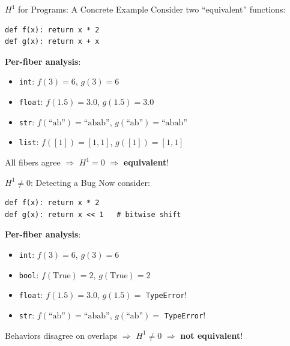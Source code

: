 \documentclass[aspectratio=169,11pt]{beamer}
\begin{document}
\begin{frame}{$H^1$ for Programs: A Concrete Example}
Consider two ``equivalent'' functions:
\begin{lstlisting}[language=deppy]
def f(x): return x * 2
def g(x): return x + x
\end{lstlisting}

\vspace{0.3em}
\textbf{Per-fiber analysis}:
\begin{itemize}
\item \texttt{int}: $f(3) = 6$, $g(3) = 6$ \checkmark
\item \texttt{float}: $f(1.5) = 3.0$, $g(1.5) = 3.0$ \checkmark
\item \texttt{str}: $f(\text{``ab''}) = \text{``abab''}$, $g(\text{``ab''}) = \text{``abab''}$ \checkmark
\item \texttt{list}: $f([1]) = [1,1]$, $g([1]) = [1,1]$ \checkmark
\end{itemize}

\vspace{0.3em}
All fibers agree $\Rightarrow$ $H^1 = 0$ $\Rightarrow$ \textbf{equivalent}!
\end{frame}

\begin{frame}{$H^1 \neq 0$: Detecting a Bug}
Now consider:
\begin{lstlisting}[language=deppy]
def f(x): return x * 2
def g(x): return x << 1   # bitwise shift
\end{lstlisting}

\vspace{0.3em}
\textbf{Per-fiber analysis}:
\begin{itemize}
\item \texttt{int}: $f(3) = 6$, $g(3) = 6$ \checkmark
\item \texttt{bool}: $f(\text{True}) = 2$, $g(\text{True}) = 2$ \checkmark
\item \texttt{float}: $f(1.5) = 3.0$, $g(1.5) = $ \texttt{TypeError}! 
\item \texttt{str}: $f(\text{``ab''}) = \text{``abab''}$, $g(\text{``ab''}) = $ \texttt{TypeError}! 
\end{itemize}

\vspace{0.3em}
Behaviors disagree on overlaps $\Rightarrow$ $H^1 \neq 0$ $\Rightarrow$ \textbf{not equivalent}!
\end{frame}
\end{document}

